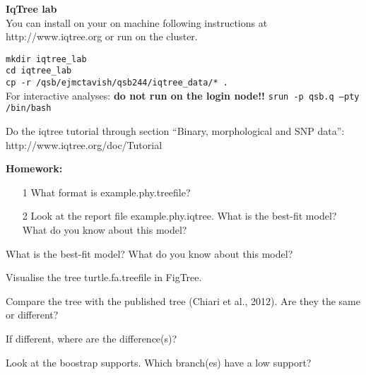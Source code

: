 \documentclass{beamer}
\begin{document}
\begin{frame}
\textbf{IqTree lab}\\
You can install on your on machine following instructions at http://www.iqtree.org
or run on the cluster.

\texttt{mkdir iqtree\_lab}\\
\texttt{cd iqtree\_lab}\\
\texttt{cp -r /qsb/ejmctavish/qsb244/iqtree\_data/* .}\\

\medskip
For interactive analyses: \textbf{do not run on the login node!!}
\texttt{srun -p qsb.q --pty /bin/bash}

\medskip
Do the iqtree tutorial through section ``Binary, morphological and SNP data'': 
http://www.iqtree.org/doc/Tutorial
 
\end{frame}

\begin{frame}
 \textbf{Homework:}\\
     \begin{itemize}
      \item[1] What format is example.phy.treefile?
      \item[2] Look at the report file example.phy.iqtree.
      What is the best-fit model? What do you know about this model?
      
     \end{itemize}

        

        What is the best-fit model? What do you know about this model?

        Visualise the tree turtle.fa.treefile in FigTree.

        Compare the tree with the published tree (Chiari et al., 2012). Are they the same or different?

        If different, where are the difference(s)?

        Look at the boostrap supports. Which branch(es) have a low support?
\end{frame}
\end{document}
